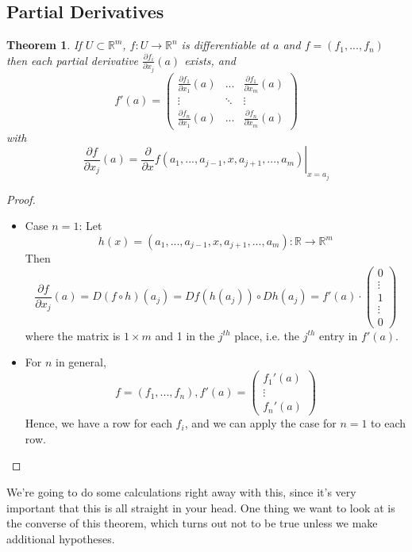 \documentclass{article}
\newtheorem{theorem}{Theorem}
\newcommand{\reals}[0]{\mathbb{R}}
\newcommand{\prt}[2]{\frac{\partial #1}{\partial #2}}
\begin{document}
\subsection{Partial Derivatives}
\begin{theorem}
  If \(U \subset \reals^m\), \(f: U \to \reals^n\) is differentiable at \(a\) and \(f = (f_1,...,f_n)\) then each partial derivative \(\prt{f_i}{x_j}(a)\) exists, and
  \begin{equation}f'(a) = \begin{pmatrix}
    \prt{f_1}{x_1}(a) & ... & \prt{f_1}{x_m}(a) \\
    \vdots & \ddots & \vdots \\
    \prt{f_n}{x_1}(a) & ... & \prt{f_n}{x_m}(a)
  \end{pmatrix}\end{equation}
  with
  \begin{equation}\prt{f}{x_j}(a) = \left.\prt{}{x}f(a_1,...,a_{j - 1}, x, a_{j + 1},..., a_m)\right|_{x = a_j}\end{equation}
\end{theorem}
\begin{proof}
  \begin{itemize}

    \item Case \(n = 1\): Let
    \begin{equation}h(x) = (a_1,...,a_{j - 1},x,a_{j + 1},...,a_m): \reals \to \reals^m\end{equation}
    Then
    \begin{equation}\prt{f}{x_j}(a) = D(f \circ h)(a_j) = Df(h(a_j)) \circ Dh(a_j)
     = f'(a) \cdot \begin{pmatrix} 0 \\ \vdots \\ 1 \\ \vdots \\ 0 \end{pmatrix}\end{equation}
     where the matrix is \(1 \times m\) and 1 in the \(j^{th}\) place, i.e. the \(j^{th}\) entry in \(f'(a)\).

     \item For \(n\) in general,
     \begin{equation}f = (f_1,...,f_n), f'(a) = \begin{pmatrix} f_1'(a) \\ \vdots \\ f_n'(a) \end{pmatrix}\end{equation}
     Hence, we have a row for each \(f_i\), and we can apply the case for \(n = 1\) to each row.

  \end{itemize}
\end{proof}
We're going to do some calculations right away with this, since it's very important that this is all straight in your head. One thing we want to look at is the converse of this theorem, which turns out not to be true unless we make additional hypotheses.
\end{document}

